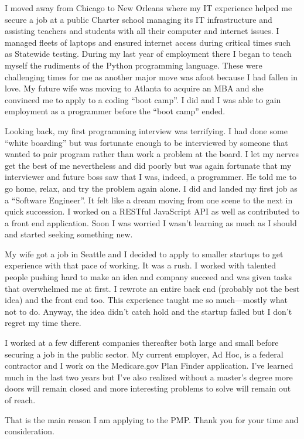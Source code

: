 \documentclass[12pt]{article}
\begin{document}
I moved away from Chicago to New Orleans where my IT experience helped me secure a job at a public Charter school managing its IT infrastructure and assisting teachers and students with all their computer and internet issues. I managed fleets of laptops and ensured internet access during critical times such as Statewide testing. During my last year of employment there I began to teach myself the rudiments of the Python programming language. These were challenging times for me as another major move was afoot because I had fallen in love. My future wife was moving to Atlanta to acquire an MBA and she convinced me to apply to a coding ``boot camp''. I did and I was able to gain employment as a programmer before the ``boot camp'' ended.

Looking back, my first programming interview was terrifying. I had done some ``white boarding'' but was fortunate enough to be interviewed by someone that wanted to pair program rather than work a problem at the board. I let my nerves get the best of me nevertheless and did poorly but was again fortunate that my interviewer and future boss saw that I was, indeed, a programmer. He told me to go home, relax, and try the problem again alone. I did and landed my first job as a ``Software Engineer''. It felt like a dream moving from one scene to the next in quick succession. I worked on a RESTful JavaScript API as well as contributed to a front end application. Soon I was worried I wasn't learning as much as I should and started seeking something new.

My wife got a job in Seattle and I decided to apply to smaller startups to get experience with that pace of working. It was a rush. I worked with talented people pushing hard to make an idea and company succeed and was given tasks that overwhelmed me at first. I rewrote an entire back end (probably not the best idea) and the front end too. This experience taught me so much---mostly what not to do. Anyway, the idea didn't catch hold and the startup failed but I don't regret my time there.

I worked at a few different companies thereafter both large and small before securing a job in the public sector. My current employer, Ad Hoc, is a federal contractor and I work on the Medicare.gov Plan Finder application. I've learned much in the last two years but I've also realized without a master's degree more doors will remain closed and more interesting problems to solve will remain out of reach.

That is the main reason I am applying to the PMP. Thank you for your time and consideration.
\end{document}
